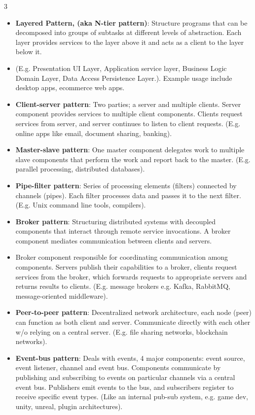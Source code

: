 \documentclass[a4paper, 9pt, landscape]{extarticle}
\begin{document}
\begin{multicols*}{3}
\begin{itemize}
  \item \textbf{Layered Pattern, (aka N-tier pattern)}: Structure programs that can be decomposed into groups of subtasks at different levels of abstraction. Each layer provides services to the layer above it and acts as a client to the layer below it. 
  \item (E.g. Presentation UI Layer, Application service layer, Business Logic Domain Layer, Data Access Persistence Layer.). Example usage include desktop apps, ecommerce web apps.
  \item \textbf{Client-server pattern}: Two parties; a server and multiple clients. Server component provides services to multiple client components. Clients request services from server, and server continues to listen to client requests. (E.g. online apps like email, document sharing, banking).
  \item \textbf{Master-slave pattern}: One master component delegates work to multiple slave components that perform the work and report back to the master. (E.g. parallel processing, distributed databases).
  \item \textbf{Pipe-filter pattern}: Series of processing elements (filters) connected by channels (pipes). Each filter processes data and passes it to the next filter. (E.g. Unix command line tools, compilers).
  \item \textbf{Broker pattern}: Structuring distributed systems with decoupled components that interact through remote service invocations. A broker component mediates communication between clients and servers. 
  \item Broker component responsible for coordinating communication among components. Servers publish their capabilities to a broker, clients request services from the broker, which forwards requests to appropriate servers and returns results to clients. (E.g. message brokers e.g. Kafka, RabbitMQ, message-oriented middleware).
  \item \textbf{Peer-to-peer pattern}: Decentralized network architecture,  each node (peer) can function as both client and server. Communicate directly with each other w/o relying on a central server. (E.g. file sharing networks, blockchain networks).
  \item \textbf{Event-bus pattern}: Deals with events, 4 major components: event source, event listener, channel and event bus. Components communicate by publishing and subscribing to events on particular channels via a central event bus. Publishers emit events to the bus, and subscribers register to receive specific event types. (Like an internal pub-sub system, e.g. game dev, unity, unreal, plugin architectures).

\end{itemize}
\end{multicols*}
\end{document}
